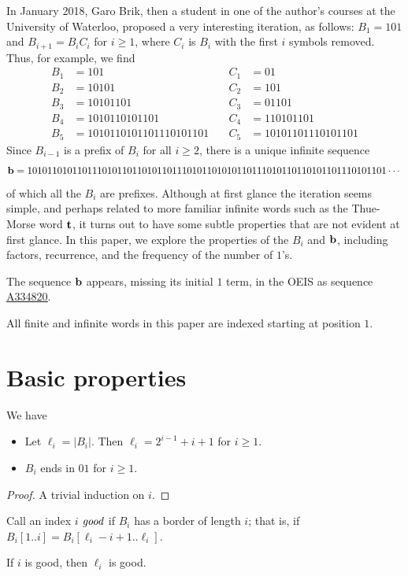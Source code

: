 \documentclass[12pt,reqno]{article}
\newcommand{\seqnum}[1]{\href{https://oeis.org/#1}{\rm \underline{#1}}}
\begin{document}
In January 2018, Garo Brik, then a student in one of the author's courses
at the University of Waterloo, proposed a very interesting iteration,
as follows:
$B_1 = 101$ and $B_{i+1} = B_i C_i$ for $i \geq 1$, where
$C_i$ is $B_i$ with the first $i$ symbols removed.
Thus, for example, we find
\begin{align*}
B_1 &= 101 &\quad C_1 &= 01 \\
B_2 &= 10101 &\quad C_2 &= 101  \\
B_3 &= 10101101 &\quad C_3 &= 01101 \\
B_4 &= 1010110101101 &\quad C_4 &= 110101101\\
B_5 &= 1010110101101110101101  &\quad C_5 &= 10101101110101101
\end{align*}
Since $B_{i-1}$ is a prefix of $B_i$ for all $i \geq 2$, there is a 
unique infinite sequence
$${\bf b} = 101011010110111010110110101101110101101010110111010110110101101110101101 \cdots$$
of which all the $B_i$ are prefixes.  Although at first glance
the iteration seems simple, and perhaps related to more familiar infinite
words such as the Thue-Morse word $\bf t$,
it turns out to have some subtle properties that are not evident at
first glance.  In this paper, we explore the properties of the $B_i$ and
$\bf b$, including factors, recurrence, 
and the frequency of the number of $1$'s.

The sequence $\bf b$ appears, missing its initial $1$ term,
in the OEIS \cite{oeis} as sequence \seqnum{A334820}.

All finite and infinite words in this paper are indexed starting at
position $1$.

\section{Basic properties}

\begin{proposition}
We have 
\begin{itemize}
\item[(a)] Let $\ell_i = |B_i|$.  Then $\ell_i = 2^{i-1} + i+1$ for $i \geq 1$.
\item[(b)] $B_i$ ends in $01$ for $i \geq 1$.
\end{itemize}
\label{useful}
\end{proposition}

\begin{proof}
A trivial induction on $i$.
\end{proof}

Call an index $i$ ${\it good\/}$ if $B_i$ has a border of length $i$; that is,
if $B_i[1..i] = B_i[\ell_i - i + 1..\ell_i]$.  
\begin{lemma}
If $i$ is good, then $\ell_i$ is good.
\label{good}
\end{lemma}
\end{document}
